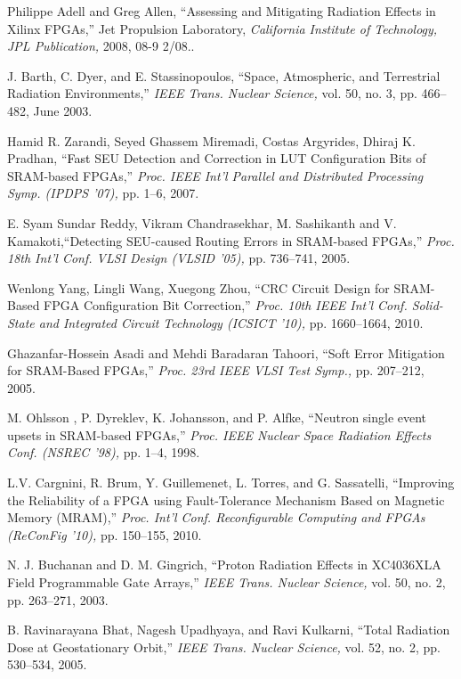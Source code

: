 \documentclass[10pt,journal,cspaper,compsoc]{IEEEtran}
\begin{document}
{{\begin{thebibliography}{1}
Philippe Adell and Greg Allen, ``Assessing and Mitigating Radiation Effects in Xilinx FPGAs,'' Jet Propulsion Laboratory, \textit{California Institute of Technology, JPL Publication,} 2008, 08-9 2/08..


J. Barth, C. Dyer, and E. Stassinopoulos, ``Space, Atmospheric, and Terrestrial Radiation Environments,'' \textit{IEEE Trans. Nuclear Science,} vol. 50, no. 3, pp. 466--482, June 2003.

Hamid R. Zarandi, Seyed Ghassem Miremadi, Costas Argyrides, Dhiraj K. Pradhan, ``\textcolor{black}{Fast} SEU Detection and Correction in LUT Configuration Bits of SRAM-based FPGAs,''  \textit{Proc. IEEE Int'l Parallel and Distributed Processing Symp. (IPDPS '07),} pp. 1--6, 2007.

E. Syam Sundar Reddy, Vikram Chandrasekhar, \textcolor{black}{M. }Sashikanth and V. Kamakoti,``Detecting SEU-caused Routing Errors in SRAM-based FPGAs,''  \textit{Proc. 18th Int'l Conf. VLSI Design (VLSID '05),} pp. 736--741, 2005.

Wenlong Yang, Lingli Wang, Xuegong Zhou, ``CRC Circuit Design for SRAM-Based FPGA Configuration Bit Correction,'' \textit{Proc. 10th IEEE Int'l Conf. Solid-State and Integrated Circuit Technology (ICSICT '10),} pp. 1660--1664, 2010.

Ghazanfar-Hossein Asadi and Mehdi Baradaran Tahoori, ``Soft Error Mitigation for SRAM-Based FPGAs,'' \textit{Proc. 23rd IEEE VLSI Test Symp.,} pp. 207--212, 2005.

M. Ohlsson , P. Dyreklev, K. Johansson, and P. Alfke, ``Neutron single event upsets in SRAM-based FPGAs,'' \textit{Proc. IEEE Nuclear Space Radiation Effects Conf. (NSREC '98),} pp. 1--4, 1998.


L.V. Cargnini, R. Brum, Y. Guillemenet, L. Torres, and G. Sassatelli, ``Improving the Reliability of a FPGA using Fault-Tolerance Mechanism Based on Magnetic Memory (MRAM),'' \textit{Proc. Int'l Conf. Reconfigurable Computing and FPGAs (ReConFig '10),} pp. 150--155, 2010.

N. J. Buchanan and D. M. Gingrich, ``Proton Radiation Effects in XC4036XLA Field Programmable Gate Arrays,'' \textit{IEEE Trans. Nuclear Science,} vol. 50, no. 2, pp. 263--271, 2003.

B. Ravinarayana Bhat, Nagesh Upadhyaya,
 and Ravi Kulkarni, ``Total Radiation Dose at Geostationary Orbit,'' \textit{IEEE Trans. Nuclear Science,} vol. 52, no. 2, pp. 530--534, 2005.


\end{thebibliography}}}
\end{document}
